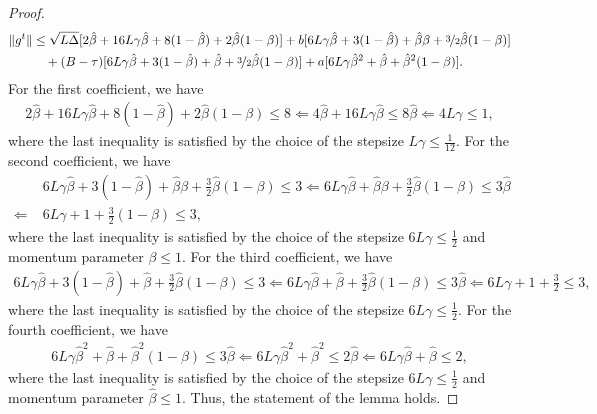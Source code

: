 \documentclass[a4paper,11pt]{article}
\begin{document}
\begin{proof}
     \begin{align*}
         \|g^t\| &\le \sqrt{L\Delta}[2\hat{\beta} 
         + 16L\gamma\hat{\beta}
         + 8(1-\hat{\beta})
         + 2\hat{\beta}(1-\beta)]
         + b[6L\gamma\hat{\beta}
         + 3(1-\hat{\beta})
         + \hat{\beta}\beta
         + \nicefrac{3}{2}\hat{\beta}(1-\beta)]\\
         &\quad + (B-\tau)[6L\gamma\hat{\beta} 
         + 3(1-\hat{\beta})
         + \hat{\beta}
         + \nicefrac{3}{2}\hat{\beta}(1-\beta)]
         + a[
         6L\gamma\hat{\beta}^2
         + \hat{\beta}
         + \hat{\beta}^2(1-\beta)
         ].
     \end{align*}
     For the first coefficient, we have
     \begin{align*}
         2\hat{\beta}
         + 16L\gamma\hat{\beta}
         + 8(1-\hat{\beta})
         + 2\hat{\beta}(1-\beta) \le 8 
         \Leftarrow 4\hat{\beta} + 16L\gamma\hat{\beta} \le 8\hat{\beta} \Leftarrow 4L\gamma \le 1,
     \end{align*}
     where the last inequality is satisfied by the choice of the stepsize $L\gamma \le \frac{1}{12}.$ For the second coefficient, we have
     \begin{align*}
         &6L\gamma\hat{\beta}
         + 3(1-\hat{\beta})
         + \hat{\beta}\beta
         + \frac{3}{2}\hat{\beta}(1-\beta) \le 3
         \Leftarrow 6L\gamma\hat{\beta} + \hat{\beta}\beta + \frac{3}{2}\hat{\beta}(1-\beta) \le 3\hat{\beta} \\
         \Leftarrow\;&
         6L\gamma + 1 + \frac{3}{2}(1-\beta)\le 3,
     \end{align*}
     where the last inequality is satisfied by the choice of the stepsize $6L\gamma \le \frac{1}{2}$ and momentum parameter $\beta \le 1$. For the third coefficient, we have
     \begin{align*}
         6L\gamma\hat{\beta}
         + 3(1-\hat{\beta})
         + \hat{\beta}
         + \frac{3}{2}\hat{\beta}(1-\beta) \le 3 
         \Leftarrow 6L\gamma\hat{\beta}
         + \hat{\beta}
         + \frac{3}{2}\hat{\beta}(1-\beta) \le 3\hat{\beta}
         \Leftarrow 
         6L\gamma
         + 1
         + \frac{3}{2} \le 3,
     \end{align*}
     where the last inequality is satisfied by the choice of the stepsize $6L\gamma \le \frac{1}{2}$. For the fourth coefficient, we have 
     \begin{align*}
         6L\gamma\hat{\beta}^2 + \hat{\beta} + \hat{\beta}^2(1-\beta) \le 3\hat{\beta} 
         \Leftarrow 6L\gamma\hat{\beta}^2 + \hat{\beta}^2 \le 2\hat{\beta} \Leftarrow 6L\gamma\hat{\beta} + \hat{\beta} \le 2,
     \end{align*}
     where the last inequality is satisfied by the choice of the stepsize $6L\gamma \le \frac{1}{2}$ and momentum parameter $\hat{\beta} \le 1.$ Thus, the statement of the lemma holds.
\end{proof}
\end{document}
